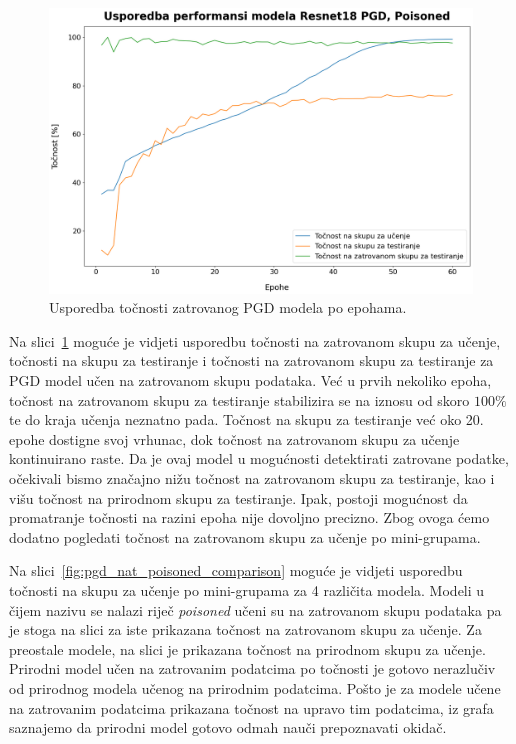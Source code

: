 \documentclass[times, utf8, zavrsni, numeric]{fer}
\begin{document}
\begin{figure}[htb]
    \centering
    \includegraphics[scale=0.41]{../stats/resnet18_poisoned_pgd_epochs_60_lr_0.1/stats_comparison.png}
    \caption{Usporedba točnosti zatrovanog PGD modela po epohama.}
    \label{fig:pgd_poisoned_acc}
\end{figure}

Na slici~\ref{fig:pgd_poisoned_acc} moguće je vidjeti usporedbu točnosti na zatrovanom skupu za učenje, točnosti na skupu za testiranje i točnosti na zatrovanom skupu za testiranje 
za PGD model učen na zatrovanom skupu podataka. Već u prvih nekoliko epoha, točnost na zatrovanom skupu za testiranje stabilizira se na iznosu od skoro $100\%$ te do kraja učenja neznatno pada.
Točnost na skupu za testiranje već oko 20. epohe dostigne svoj vrhunac, dok točnost na zatrovanom skupu za učenje kontinuirano raste. Da je ovaj model u mogućnosti detektirati zatrovane podatke,
očekivali bismo značajno nižu točnost na zatrovanom skupu za testiranje, kao i višu točnost na prirodnom skupu za testiranje. 
Ipak, postoji mogućnost da promatranje točnosti na razini epoha nije dovoljno precizno. Zbog ovoga ćemo dodatno pogledati točnost na zatrovanom skupu za učenje po mini-grupama.

Na slici~\ref{fig:pgd_nat_poisoned_comparison} moguće je vidjeti usporedbu točnosti na skupu za učenje po mini-grupama za 4 različita modela.
Modeli u čijem nazivu se nalazi riječ \textit{poisoned} učeni su na zatrovanom skupu podataka pa je stoga na slici za iste prikazana točnost na zatrovanom skupu za učenje.
Za preostale modele, na slici je prikazana točnost na prirodnom skupu za učenje.
Prirodni model učen na zatrovanim podatcima po točnosti je gotovo nerazlučiv od prirodnog modela učenog na prirodnim podatcima.
Pošto je za modele učene na zatrovanim podatcima prikazana točnost na upravo tim podatcima, iz grafa saznajemo da prirodni model gotovo odmah nauči prepoznavati okidač.
\end{document}
